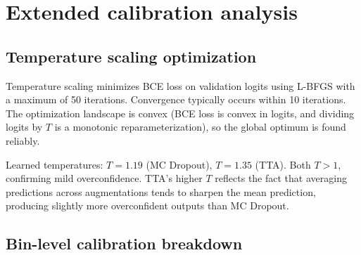 \section{Extended calibration analysis}
\label{app:calibration}

\subsection{Temperature scaling optimization}

Temperature scaling minimizes BCE loss on validation logits using L-BFGS
with a maximum of 50 iterations. Convergence typically occurs within 10
iterations. The optimization landscape is convex (BCE loss is convex in
logits, and dividing logits by $T$ is a monotonic reparameterization),
so the global optimum is found reliably.

Learned temperatures: $T = 1.19$ (MC Dropout), $T = 1.35$ (TTA). Both
$T > 1$, confirming mild overconfidence. TTA's higher $T$ reflects the
fact that averaging predictions across augmentations tends to sharpen
the mean prediction, producing slightly more overconfident outputs than
MC Dropout.

\subsection{Bin-level calibration breakdown}

